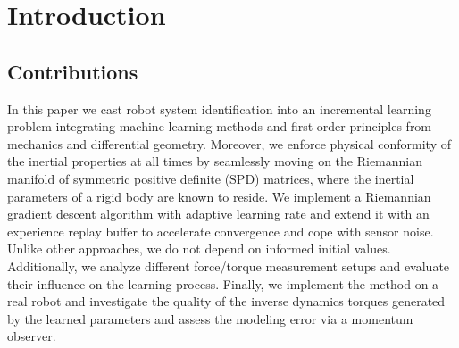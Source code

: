 %
%
%
%
%
%

\section{Introduction}
\subsection{Contributions}
In this paper we cast robot system identification into an incremental learning problem integrating machine learning methods and first-order principles from mechanics and differential geometry. Moreover, we enforce physical conformity of the inertial properties at all times by seamlessly moving on the Riemannian manifold of symmetric positive definite (SPD) matrices, where the inertial parameters of a rigid body are known to reside. We implement a Riemannian gradient descent algorithm with adaptive learning rate and extend it with an experience replay buffer to accelerate convergence and cope with sensor noise. Unlike other approaches, we do not depend on informed initial values. Additionally, we analyze different force/torque measurement setups and evaluate their influence on the learning process. Finally, we implement the method on a real robot and investigate the quality of the inverse dynamics torques generated by the learned parameters and assess the modeling error via a momentum observer.


